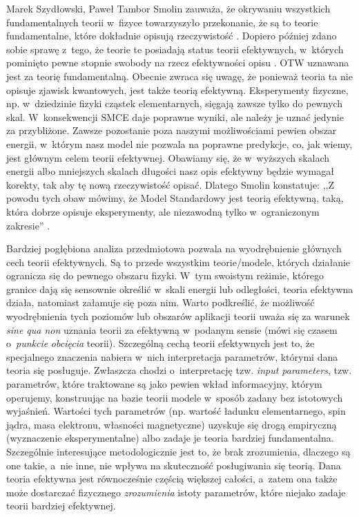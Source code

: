 \begin{artplenv2auth}{Marek Szydłowski, Paweł Tambor}
Smolin zauważa, że okrywaniu wszystkich fundamentalnych teorii w~fizyce towarzyszyło przekonanie, że są to teorie fundamentalne, które dokładnie opisują rzeczywistość
\parencite[][s.~163–167]{smolin_czas_2015}. %
 Dopiero później zdano sobie sprawę z~tego, że teorie te posiadają status teorii efektywnych, w~których pominięto pewne stopnie swobody na rzecz efektywności opisu 
\parencite[][]{wilson_non-reductive_2010}. %
 OTW uznawana jest za teorię fundamentalną. Obecnie zwraca się uwagę, że ponieważ teoria ta nie opisuje zjawisk kwantowych, jest także teorią efektywną. Eksperymenty fizyczne, np. w~dziedzinie fizyki cząstek elementarnych, sięgają zawsze tylko do pewnych skal. W~konsekwencji SMCE daje poprawne wyniki, ale należy je uznać jedynie za przybliżone. Zawsze pozostanie poza naszymi możliwościami pewien obszar energii, w~którym nasz model nie pozwala na poprawne predykcje, co, jak wiemy, jest głównym celem teorii efektywnej. Obawiamy się, że w~wyższych skalach energii albo mniejszych skalach długości nasz opis efektywny będzie wymagał korekty, tak aby tę nową rzeczywistość opisać. Dlatego Smolin konstatuje: ,,Z powodu tych obaw mówimy, że Model Standardowy jest teorią efektywną, taką, która dobrze opisuje eksperymenty, ale niezawodną tylko w~ograniczonym zakresie'' 
\parencite[][s.~164]{smolin_czas_2015}.%


Bardziej pogłębiona analiza przedmiotowa pozwala na wyodrębnienie głównych cech teorii efektywnych. Są to przede wszystkim teorie/modele, których działanie ogranicza się do pewnego obszaru fizyki. W~tym swoistym reżimie, którego granice dają się sensownie określić w~skali energii lub odległości, teoria efektywna działa, natomiast załamuje się poza nim. Warto podkreślić, że możliwość wyodrębnienia tych poziomów lub obszarów aplikacji teorii uważa się za warunek \textit{sine qua non} uznania teorii za efektywną w~podanym sensie (mówi się czasem o~\textit{punkcie} \textit{obcięcia} teorii). Szczególną cechą teorii efektywnych jest to, że specjalnego znaczenia nabiera w~nich interpretacja parametrów, którymi dana teoria się posługuje. Zwłaszcza chodzi o~interpretację tzw. \textit{input parameters}, tzw. parametrów, które traktowane są jako pewien wkład informacyjny, którym operujemy, konstruując na bazie teorii modele w~sposób zadany bez istotowych wyjaśnień. Wartości tych parametrów (np. wartość ładunku elementarnego, spin jądra, masa elektronu, własności magnetyczne) uzyskuje się drogą empiryczną (wyznaczenie eksperymentalne) albo zadaje je teoria bardziej fundamentalna. Szczególnie interesujące metodologicznie jest to, że brak zrozumienia, dlaczego są one takie, a~nie inne, nie wpływa na skuteczność posługiwania się teorią. Dana teoria efektywna jest równocześnie częścią większej całości, a~zatem ona także może dostarczać fizycznego \textit{zrozumienia} istoty parametrów, które niejako zadaje teorii bardziej efektywnej.


\end{artplenv2auth}
